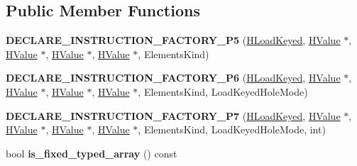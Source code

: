 \subsection*{Public Member Functions}
\begin{DoxyCompactItemize}
\item 
{\bfseries D\+E\+C\+L\+A\+R\+E\+\_\+\+I\+N\+S\+T\+R\+U\+C\+T\+I\+O\+N\+\_\+\+F\+A\+C\+T\+O\+R\+Y\+\_\+\+P5} (\hyperlink{classv8_1_1internal_1_1_h_load_keyed}{H\+Load\+Keyed}, \hyperlink{classv8_1_1internal_1_1_h_value}{H\+Value} $\ast$, \hyperlink{classv8_1_1internal_1_1_h_value}{H\+Value} $\ast$, \hyperlink{classv8_1_1internal_1_1_h_value}{H\+Value} $\ast$, \hyperlink{classv8_1_1internal_1_1_h_value}{H\+Value} $\ast$, Elements\+Kind)\hypertarget{classv8_1_1internal_1_1_h_load_keyed_a710e7f7a4e69649e288f4f5b5bdabbd0}{}\label{classv8_1_1internal_1_1_h_load_keyed_a710e7f7a4e69649e288f4f5b5bdabbd0}

\item 
{\bfseries D\+E\+C\+L\+A\+R\+E\+\_\+\+I\+N\+S\+T\+R\+U\+C\+T\+I\+O\+N\+\_\+\+F\+A\+C\+T\+O\+R\+Y\+\_\+\+P6} (\hyperlink{classv8_1_1internal_1_1_h_load_keyed}{H\+Load\+Keyed}, \hyperlink{classv8_1_1internal_1_1_h_value}{H\+Value} $\ast$, \hyperlink{classv8_1_1internal_1_1_h_value}{H\+Value} $\ast$, \hyperlink{classv8_1_1internal_1_1_h_value}{H\+Value} $\ast$, \hyperlink{classv8_1_1internal_1_1_h_value}{H\+Value} $\ast$, Elements\+Kind, Load\+Keyed\+Hole\+Mode)\hypertarget{classv8_1_1internal_1_1_h_load_keyed_ab3b845df52cfb4441cd6f0cd48e000a1}{}\label{classv8_1_1internal_1_1_h_load_keyed_ab3b845df52cfb4441cd6f0cd48e000a1}

\item 
{\bfseries D\+E\+C\+L\+A\+R\+E\+\_\+\+I\+N\+S\+T\+R\+U\+C\+T\+I\+O\+N\+\_\+\+F\+A\+C\+T\+O\+R\+Y\+\_\+\+P7} (\hyperlink{classv8_1_1internal_1_1_h_load_keyed}{H\+Load\+Keyed}, \hyperlink{classv8_1_1internal_1_1_h_value}{H\+Value} $\ast$, \hyperlink{classv8_1_1internal_1_1_h_value}{H\+Value} $\ast$, \hyperlink{classv8_1_1internal_1_1_h_value}{H\+Value} $\ast$, \hyperlink{classv8_1_1internal_1_1_h_value}{H\+Value} $\ast$, Elements\+Kind, Load\+Keyed\+Hole\+Mode, int)\hypertarget{classv8_1_1internal_1_1_h_load_keyed_ad28db8488f549f80bc052629979982fb}{}\label{classv8_1_1internal_1_1_h_load_keyed_ad28db8488f549f80bc052629979982fb}

\item 
bool {\bfseries is\+\_\+fixed\+\_\+typed\+\_\+array} () const \hypertarget{classv8_1_1internal_1_1_h_load_keyed_abdedbb8bef690bb20bdbd1c8701b65c6}{}\label{classv8_1_1internal_1_1_h_load_keyed_abdedbb8bef690bb20bdbd1c8701b65c6}


\end{DoxyCompactItemize}
